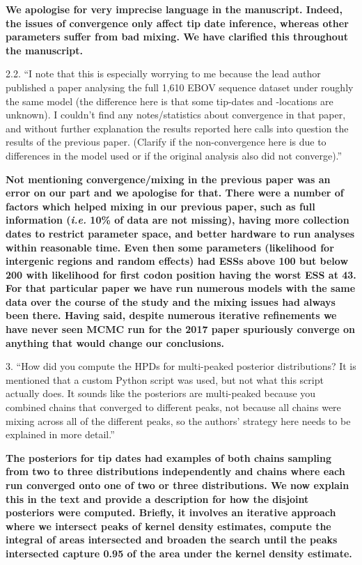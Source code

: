 \documentclass[11pt,oneside,letterpaper]{article}
\begin{document}
\textbf{We apologise for very imprecise language in the manuscript. Indeed, the issues of convergence only affect tip date inference, whereas other parameters suffer from bad mixing. We have clarified this throughout the manuscript.}

2.2. ``I note that this is especially worrying to me because the lead author published a paper analysing the full 1,610 EBOV sequence dataset under roughly the same model (the difference here is that some tip-dates and -locations are unknown). I couldn't find any notes/statistics about convergence in that paper, and without further explanation the results reported here calls into question the results of the previous paper. (Clarify if the non-convergence here is due to differences in the model used or if the original analysis also did not converge).''

\textbf{Not mentioning convergence/mixing in the previous paper was an error on our part and we apologise for that. There were a number of factors which helped mixing in our previous paper, such as full information (\textit{i.e.} 10\% of data are not missing), having more collection dates to restrict parameter space, and better hardware to run analyses within reasonable time. Even then some parameters (likelihood for intergenic regions and random effects) had ESSs above 100 but below 200 with likelihood for first codon position having the worst ESS at 43. For that particular paper we have run numerous models with the same data over the course of the study and the mixing issues had always been there. Having said, despite numerous iterative refinements we have never seen MCMC run for the 2017 paper spuriously converge on anything that would change our conclusions.}

3. ``How did you compute the HPDs for multi-peaked posterior distributions? It is mentioned that a custom Python script was used, but not what this script actually does. It sounds like the posteriors are multi-peaked because you combined chains that converged to different peaks, not because all chains were mixing across all of the different peaks, so the authors' strategy here needs to be explained in more detail.''

\textbf{The posteriors for tip dates had examples of both chains sampling from two to three distributions independently and chains where each run converged onto one of two or three distributions. We now explain this in the text and provide a description for how the disjoint posteriors were computed. Briefly, it involves an iterative approach where we intersect peaks of kernel density estimates, compute the integral of areas intersected and broaden the search until the peaks intersected capture 0.95 of the area under the kernel density estimate.}
\end{document}
